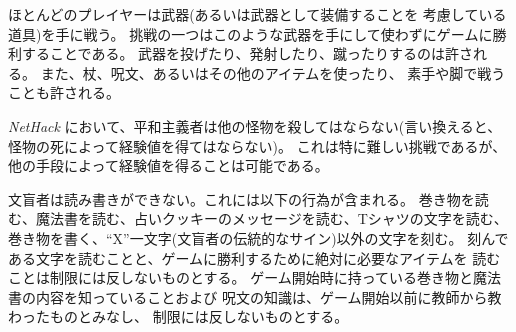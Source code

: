ほとんどのプレイヤーは武器(あるいは武器として装備することを
考慮している道具)を手に戦う。
挑戦の一つはこのような武器を手にして使わずにゲームに勝利することである。
武器を投げたり、発射したり、蹴ったりするのは許される。
また、杖、呪文、あるいはその他のアイテムを使ったり、
素手や脚で戦うことも許される。

{\it NetHack} において、平和主義者は他の怪物を殺してはならない(言い換えると、
怪物の死によって経験値を得てはならない)。
これは特に難しい挑戦であるが、他の手段によって経験値を得ることは可能である。

文盲者は読み書きができない。これには以下の行為が含まれる。
巻き物を読む、魔法書を読む、占いクッキーのメッセージを読む、Tシャツの文字を読む、
巻き物を書く、``X''一文字(文盲者の伝統的なサイン)以外の文字を刻む。
刻んである文字を読むことと、ゲームに勝利するために絶対に必要なアイテムを
読むことは制限には反しないものとする。
ゲーム開始時に持っている巻き物と魔法書の内容を知っていることおよび
呪文の知識は、ゲーム開始以前に教師から教わったものとみなし、
制限には反しないものとする。

